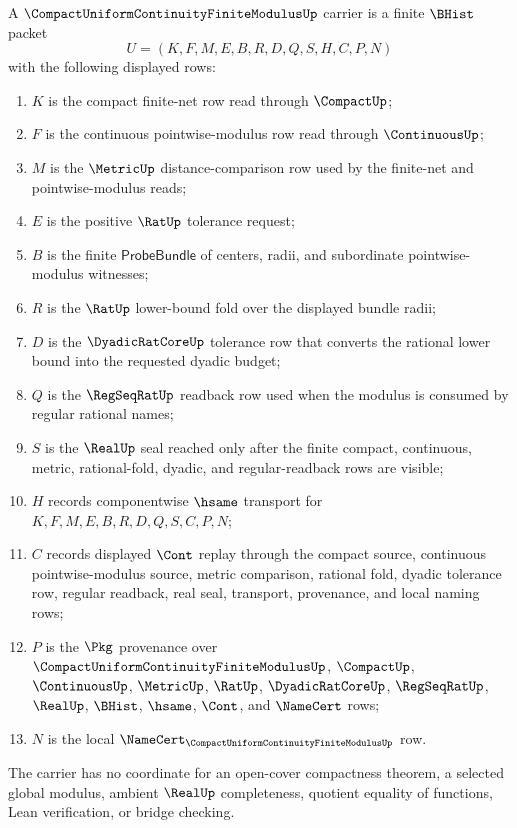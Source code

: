 \begin{definition}
\label{def:compact-uniform-continuity-finite-modulus-carrier}
A $\CompactUniformContinuityFiniteModulusUp$ carrier is a finite $\BHist$ packet
$$
U=(K,F,M,E,B,R,D,Q,S,H,C,P,N)
$$
with the following displayed rows:
\begin{enumerate}
\item $K$ is the compact finite-net row read through $\CompactUp$;
\item $F$ is the continuous pointwise-modulus row read through $\ContinuousUp$;
\item $M$ is the $\MetricUp$ distance-comparison row used by the finite-net and pointwise-modulus reads;
\item $E$ is the positive $\RatUp$ tolerance request;
\item $B$ is the finite $\mathsf{ProbeBundle}$ of centers, radii, and subordinate pointwise-modulus witnesses;
\item $R$ is the $\RatUp$ lower-bound fold over the displayed bundle radii;
\item $D$ is the $\DyadicRatCoreUp$ tolerance row that converts the rational lower bound into the requested dyadic budget;
\item $Q$ is the $\RegSeqRatUp$ readback row used when the modulus is consumed by regular rational names;
\item $S$ is the $\RealUp$ seal reached only after the finite compact, continuous, metric, rational-fold, dyadic, and regular-readback rows are visible;
\item $H$ records componentwise $\hsame$ transport for $K,F,M,E,B,R,D,Q,S,C,P,N$;
\item $C$ records displayed $\Cont$ replay through the compact source, continuous pointwise-modulus source, metric comparison, rational fold, dyadic tolerance row, regular readback, real seal, transport, provenance, and local naming rows;
\item $P$ is the $\Pkg$ provenance over $\CompactUniformContinuityFiniteModulusUp$, $\CompactUp$, $\ContinuousUp$, $\MetricUp$, $\RatUp$, $\DyadicRatCoreUp$, $\RegSeqRatUp$, $\RealUp$, $\BHist$, $\hsame$, $\Cont$, and $\NameCert$ rows;
\item $N$ is the local $\NameCert_{\CompactUniformContinuityFiniteModulusUp}$ row.
\end{enumerate}
The carrier has no coordinate for an open-cover compactness theorem, a selected global modulus, ambient $\RealUp$ completeness, quotient equality of functions, Lean verification, or bridge checking.
\end{definition}

